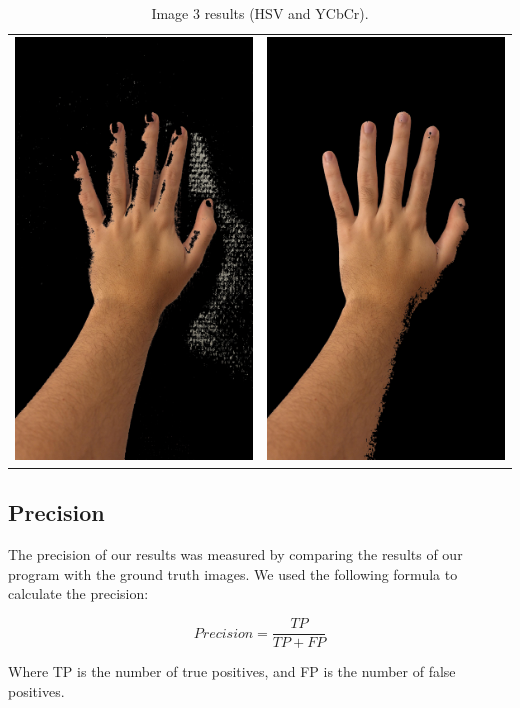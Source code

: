 \documentclass[journal]{IEEEtran}
\begin{document}
\begin{table}[!htbp]
\centering
\begin{tabular}{cc}
    \includegraphics[width=0.3\linewidth]{../images/results/hand3_skin_hsv.jpg} & \includegraphics[width=0.3\linewidth]{../images/results/hand3_skin_ycc.jpg} \\
\end{tabular}
\caption{Image 3 results (HSV and YCbCr).}
\label{tab:images3}
\end{table}

\subsection{Precision}

The precision of our results was measured by comparing the results of our program with the ground truth images. We used the following formula to calculate the precision:

\begin{equation}
    Precision = \frac{TP}{TP + FP}
\end{equation}

Where TP is the number of true positives, and FP is the number of false positives.
\end{document}
